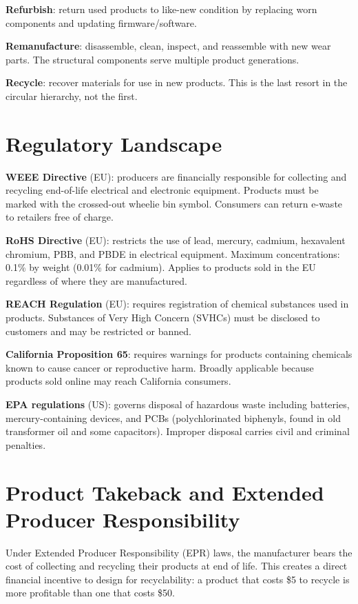 \textbf{Refurbish}: return used products to like-new condition by replacing worn components and updating firmware/software.

\textbf{Remanufacture}: disassemble, clean, inspect, and reassemble with new wear parts. The structural components serve multiple product generations.

\textbf{Recycle}: recover materials for use in new products. This is the last resort in the circular hierarchy, not the first.

\section{Regulatory Landscape}
\textbf{WEEE Directive} (EU): producers are financially responsible for collecting and recycling end-of-life electrical and electronic equipment. Products must be marked with the crossed-out wheelie bin symbol. Consumers can return e-waste to retailers free of charge.

\textbf{RoHS Directive} (EU): restricts the use of lead, mercury, cadmium, hexavalent chromium, PBB, and PBDE in electrical equipment. Maximum concentrations: 0.1\% by weight (0.01\% for cadmium). Applies to products sold in the EU regardless of where they are manufactured.

\textbf{REACH Regulation} (EU): requires registration of chemical substances used in products. Substances of Very High Concern (SVHCs) must be disclosed to customers and may be restricted or banned.

\textbf{California Proposition 65}: requires warnings for products containing chemicals known to cause cancer or reproductive harm. Broadly applicable because products sold online may reach California consumers.

\textbf{EPA regulations} (US): governs disposal of hazardous waste including batteries, mercury-containing devices, and PCBs (polychlorinated biphenyls, found in old transformer oil and some capacitors). Improper disposal carries civil and criminal penalties.

\section{Product Takeback and Extended Producer Responsibility}
Under Extended Producer Responsibility (EPR) laws, the manufacturer bears the cost of collecting and recycling their products at end of life. This creates a direct financial incentive to design for recyclability: a product that costs \$5 to recycle is more profitable than one that costs \$50.

